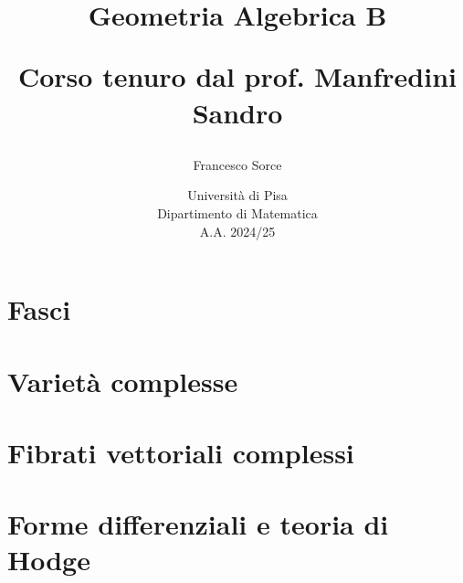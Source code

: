 \documentclass[a4paper]{report}
\title{\huge Geometria Algebrica B
\vspace{0.7cm}

\Large Corso tenuro dal prof. Manfredini Sandro}
\author{\Large Francesco Sorce}
\date{Università di Pisa\\
Dipartimento di Matematica\\
A.A. 2024/25}
\begin{document}
\maketitle

\tableofcontents
\newpage


\part{Fasci}


\part{Variet\`a complesse}

\part{Fibrati vettoriali complessi}

\part{Forme differenziali e teoria di Hodge}
\end{document}
